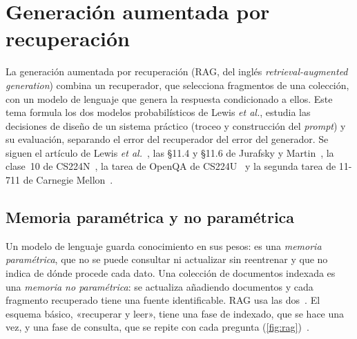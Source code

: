\chapter{Generación aumentada por recuperación}
\label{tema:5}

La generación aumentada por recuperación (RAG, del inglés \emph{retrieval-augmented generation}) combina un recuperador, que selecciona fragmentos de una colección, con un modelo de lenguaje que genera la respuesta condicionado a ellos. Este tema formula los dos modelos probabilísticos de Lewis \emph{et al.}, estudia las decisiones de diseño de un sistema práctico (troceo y construcción del \emph{prompt}) y su evaluación, separando el error del recuperador del error del generador. Se siguen el artículo de Lewis \emph{et al.}~\cite{rag}, las §11.4 y §11.6 de Jurafsky y Martin~\cite{jm3}, la clase~10 de CS224N~\cite{cs224n}, la tarea de OpenQA de CS224U~\cite{cs224u} y la segunda tarea de 11-711 de Carnegie Mellon~\cite{cmu711}.

\section{Memoria paramétrica y no paramétrica}

Un modelo de lenguaje guarda conocimiento en sus pesos: es una \emph{memoria paramétrica}, que no se puede consultar ni actualizar sin reentrenar y que no indica de dónde procede cada dato. Una colección de documentos indexada es una \emph{memoria no paramétrica}: se actualiza añadiendo documentos y cada fragmento recuperado tiene una fuente identificable. RAG usa las dos~\cite{rag}. El esquema básico, «recuperar y leer», tiene una fase de indexado, que se hace una vez, y una fase de consulta, que se repite con cada pregunta (\cref{fig:rag})~\cite[§11.4]{jm3}.

